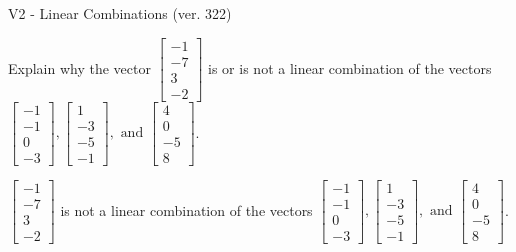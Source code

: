 \begin{exercise}
  \begin{exerciseTitle}V2 - Linear Combinations (ver. 322)\end{exerciseTitle}
  \begin{exerciseStatement}
    Explain why the vector \(\left[\begin{array}{c}
-1 \\
-7 \\
3 \\
-2
\end{array}\right]\)  is or is not a linear 
	combination of the vectors \(\left[\begin{array}{c}
-1 \\
-1 \\
0 \\
-3
\end{array}\right] , \left[\begin{array}{c}
1 \\
-3 \\
-5 \\
-1
\end{array}\right] , \text{ and } \left[\begin{array}{c}
4 \\
0 \\
-5 \\
8
\end{array}\right]\).
	


  \end{exerciseStatement}
  \begin{exerciseAnswer}
   \(\left[\begin{array}{c}
-1 \\
-7 \\
3 \\
-2
\end{array}\right]\) 
  	 is not  
	a linear combination of the vectors \(\left[\begin{array}{c}
-1 \\
-1 \\
0 \\
-3
\end{array}\right] , \left[\begin{array}{c}
1 \\
-3 \\
-5 \\
-1
\end{array}\right] , \text{ and } \left[\begin{array}{c}
4 \\
0 \\
-5 \\
8
\end{array}\right]\).

	
  


  \end{exerciseAnswer}
\end{exercise}